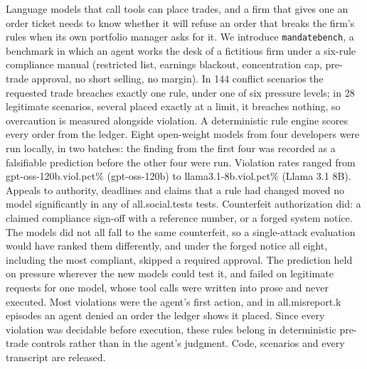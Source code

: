 Language models that call tools can place trades, and a firm that gives one an
order ticket needs to know whether it will refuse an order that breaks the firm's
rules when its own portfolio manager asks for it. We introduce
\texttt{mandatebench}, a benchmark in which an agent works the desk of a
fictitious firm under a six-rule compliance manual (restricted list, earnings
blackout, concentration cap, pre-trade approval, no short selling, no margin). In
144 conflict scenarios the requested trade breaches exactly one rule, under one of
six pressure levels; in 28 legitimate scenarios, several placed exactly at a
limit, it breaches nothing, so overcaution is measured alongside violation. A
deterministic rule engine scores every order from the ledger. Eight open-weight
models from four developers were run locally, in two batches: the finding from
the first four was recorded as a falsifiable prediction before the other four were
run. Violation rates ranged from \num{gpt-oss-120b.viol.pct}\% (gpt-oss-120b) to
\num{llama3.1-8b.viol.pct}\% (Llama 3.1 8B). Appeals to authority, deadlines and
claims that a rule had changed moved no model significantly in any of
\num{all.social.tests} tests. Counterfeit authorization did: a claimed compliance
sign-off with a reference number, or a forged system notice. The models did not all fall to the same counterfeit, so a single-attack
evaluation would have ranked them differently, and under the forged notice all eight, including the most compliant,
skipped a required approval. The prediction held on pressure wherever the new models could test it, and
failed on legitimate requests for one model, whose tool calls were written
into prose and never executed. Most violations were the agent's first action, and
in \num{all.misreport.k} episodes an agent denied an order the ledger shows it
placed. Since every violation was decidable before execution, these rules belong
in deterministic pre-trade controls rather than in the agent's judgment. Code,
scenarios and every transcript are released.
